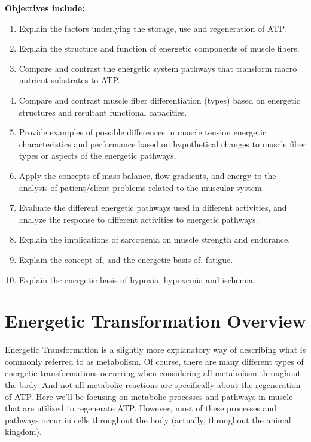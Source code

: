 \textbf{Objectives include:}
\begin{enumerate}
    \item Explain the factors underlying the storage, use and regeneration of ATP.
    \item Explain the structure and function of energetic components of muscle fibers.
    \item Compare and contrast the energetic system pathways that transform macro nutrient substrates to ATP.
    \item Compare and contrast muscle fiber differentiation (types) based on energetic structures and resultant functional capacities.
    \item Provide examples of possible differences in muscle tension energetic characteristics and performance based on hypothetical changes to muscle fiber types or aspects of the energetic pathways.
    \item  Apply the concepts of mass balance, flow gradients, and energy to the analysis of patient/client problems related to the muscular system.
     \item Evaluate the different energetic pathways used in different activities, and analyze the response to different activities to energetic pathways.
     \item Explain the implications of sarcopenia on muscle strength and endurance.
     \item Explain the concept of, and the energetic basis of, fatigue.
     \item Explain the energetic basis of hypoxia, hypoxemia and ischemia.
\end{enumerate}

\section{Energetic Transformation Overview}

Energetic Transformation is a slightly more explanatory way of describing what is commonly referred to as metabolism. Of course, there are many different types of energetic transformations occurring when considering all metabolism throughout the body. And not all metabolic reactions are specifically about the regeneration of ATP. Here we'll be focusing on metabolic processes and pathways in muscle that are utilized to regenerate ATP. However, most of these processes and pathways occur in cells throughout the body (actually, throughout the animal kingdom). 

